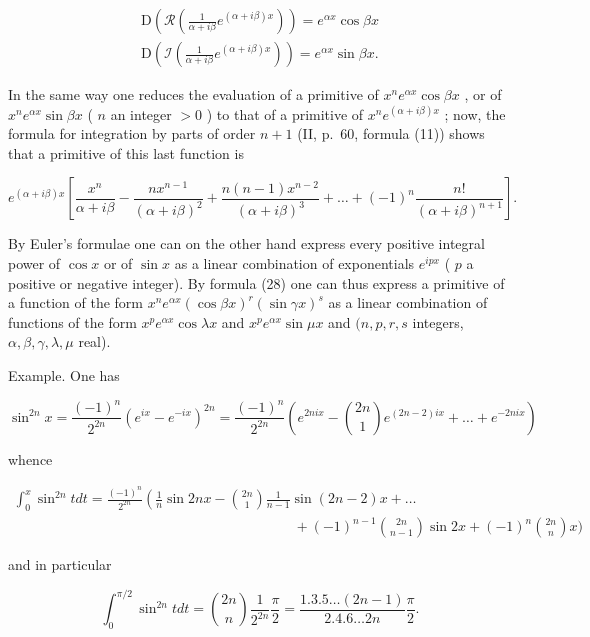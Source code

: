 \[
\begin{array}{l} \mathrm{D} \left(\mathcal {R} \left(\frac {1}{\alpha + i \beta} e ^ {(\alpha + i \beta) x}\right)\right) = e ^ {\alpha x} \cos \beta x \\ \mathrm{D} \left(\mathcal {I} \left(\frac {1}{\alpha + i \beta} e ^ {(\alpha + i \beta) x}\right)\right) = e ^ {\alpha x} \sin \beta x. \end{array}
\]

In the same way one reduces the evaluation of a primitive of \(x^n e^{\alpha x} \cos \beta x\) , or of \(x^n e^{\alpha x} \sin \beta x\) ( \(n\) an integer \(> 0\) ) to that of a primitive of \(x^n e^{(\alpha + i\beta)x}\) ; now, the formula for integration by parts of order \(n + 1\) (II, p.~60, formula (11)) shows that a primitive of this last function is

\[
e ^ {(\alpha + i \beta) x} \left[ \frac {x ^ {n}}{\alpha + i \beta} - \frac {n x ^ {n - 1}}{(\alpha + i \beta) ^ {2}} + \frac {n (n - 1) x ^ {n - 2}}{(\alpha + i \beta) ^ {3}} + \dots + (- 1) ^ {n} \frac {n !}{(\alpha + i \beta) ^ {n + 1}} \right].
\]

By Euler's formulae one can on the other hand express every positive integral power of \(\cos x\) or of \(\sin x\) as a linear combination of exponentials \(e^{ipx}\) ( \(p\) a positive or negative integer). By formula (28) one can thus express a primitive of a function of the form \(x^n e^{\alpha x}(\cos \beta x)^r (\sin \gamma x)^s\) as a linear combination of functions of the form \(x^p e^{\alpha x}\cos \lambda x\) and \(x^p e^{\alpha x}\sin \mu x\) and \((n, p, r, s\) integers, \(\alpha, \beta, \gamma, \lambda, \mu\) real).

Example. One has

\[
\sin^ {2 n} x = \frac {(- 1) ^ {n}}{2 ^ {2 n}} \left(e ^ {i x} - e ^ {- i x}\right) ^ {2 n} = \frac {(- 1) ^ {n}}{2 ^ {2 n}} \left(e ^ {2 n i x} - \binom {2 n} {1} e ^ {(2 n - 2) i x} + \dots + e ^ {- 2 n i x}\right)
\]

whence

\[
\begin{array}{l} \int_ {0} ^ {x} \sin^ {2 n} t d t = \frac {(- 1) ^ {n}}{2 ^ {2 n}} \left(\frac {1}{n} \sin 2 n x - \binom {2 n} {1} \frac {1}{n - 1} \sin (2 n - 2) x + \dots \right. \\ \qquad \qquad \qquad \qquad \qquad \qquad \qquad \qquad \qquad \qquad + (- 1) ^ {n - 1} \binom {2 n} {n - 1} \sin 2 x + (- 1) ^ {n} \binom {2 n} {n} x \Bigg) \end{array}
\]

and in particular

\[
\int_ {0} ^ {\pi / 2} \sin^ {2 n} t   d t = \binom {2 n} {n} \frac {1}{2 ^ {2 n}}   \frac {\pi}{2} = \frac {1 . 3 . 5 \ldots (2 n - 1)}{2 . 4 . 6 \ldots 2 n}   \frac {\pi}{2}.\tag{29}
\]

